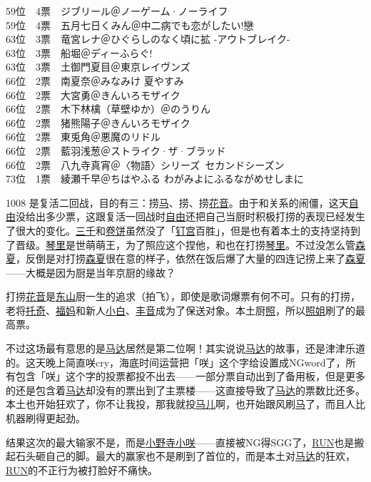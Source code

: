 {    59位　4票　ジブリール＠ノーゲーム·ノーライフ\\
    59位　4票　五月七日くみん＠中二病でも恋がしたい!戀\\
    63位　3票　竜宮レナ＠ひぐらしのなく頃に拡 -アウトブレイク-\\
    63位　3票　船堀＠ディーふらぐ!\\
    63位　3票　土御門夏目＠東京レイヴンズ\\
    66位　2票　南夏奈＠みなみけ 夏やすみ\\
    66位　2票　大宮勇＠きんいろモザイク\\
    66位　2票　木下林檎（草壁ゆか）＠のうりん\\
    66位　2票　猪熊陽子＠きんいろモザイク\\
    66位　2票　東兎角＠悪魔のリドル\\
    66位　2票　藍羽浅葱＠ストライク·ザ·ブラッド\\
    66位　2票　八九寺真宵＠〈物語〉シリーズ~セカンドシーズン\\
    73位　1票　綾瀬千早＠ちはやふる わがみよにふるながめせしまに
}

1008 是复活二回战，目的有三：捞\uline{马}、捞、捞\uline{花音}。由于和关系的闹僵，这天\uline{自由}没给出多少票，这跟复活一回战时\uline{自由}还把自己当厨时积极打捞的表现已经发生了很大的变化。\uline{三千}和\uline{卷饼}虽然没了「\uline{钉宫}百胜」，但是也有着本土的支持坚持到了晋级。\uline{琴里}是世萌萌王，为了照应这个捏他，和也在打捞\uline{琴里}。不过没怎么管\uline{森夏}，反倒是对打捞\uline{森夏}很在意的样子，依然在饭后爆了大量的四连记捞上来了\uline{森夏}——大概是因为厨是当年京厨的缘故？

打捞\uline{花音}是\uline{东山}厨一生的追求（拍飞），即使是歌词爆票有何不可。只有的打捞，老将\uline{托奇}、\uline{福妈}和新人\uline{小白}、\uline{丰音}成为了保送对象。本土厨\uline{照}，所以\uline{照姐}刷了的最高票。

不过这场最有意思的是\uline{马达}居然是第二位啊！其实说说\uline{马达}的故事，还是津津乐道的。这天晚上简直咲cry，海底时间运营把「咲」这个字给设置成NGword了，所有包含「咲」这个字的投票都投不出去——一部分票自动出到了备用板，但是更多的还是包含着\uline{马达}却没有的票出到了主票楼——这直接导致了\uline{马达}的票数比还多。本土也开始狂欢了，你不让我投，那我就投\uline{马儿}啊，也开始跟风刷\uline{马}了，而且人比机器刷得更起劲。

结果这次的最大输家不是，而是\uline{小野寺小咲}——直接被NG得SGG了，\uline{RUN}也是搬起石头砸自己的脚。最大的赢家也不是刷到了首位的，而是本土对\uline{马达}的狂欢，\uline{RUN}的不正行为被打脸好不痛快。
\\

